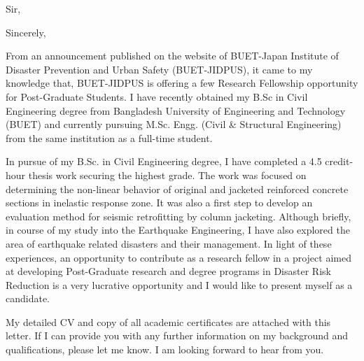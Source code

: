 %
\date{\today} %
\opening{Sir,} %
\closing{\hfill \break Sincerely,} %

\makelettertitle %
From an announcement published on the website of BUET-Japan Institute of Disaster Prevention and Urban Safety (BUET-JIDPUS), it came to my knowledge that, BUET-JIDPUS is offering a few Research Fellowship opportunity for Post-Graduate Students. I have recently obtained my B.Sc in Civil Engineering degree from Bangladesh University of Engineering and Technology (BUET) and currently pursuing M.Sc. Engg. (Civil \& Structural Engineering) from the same institution as a full-time student. 

In pursue of my B.Sc. in Civil Engineering degree, I have completed a 4.5 credit-hour thesis work securing the highest grade. The work was focused on determining the non-linear behavior of  original and jacketed reinforced concrete sections in inelastic response zone. It was also a first step to develop an evaluation method for seismic retrofitting by column jacketing. Although briefly, in course of my study into the Earthquake Engineering, I have also explored the area of earthquake related disasters and their management. In light of these experiences, an opportunity to contribute as a research fellow in a project aimed at developing Post-Graduate research and degree programs in Disaster Risk Reduction is a very lucrative opportunity and I would like to present myself as a candidate.  

My detailed CV and copy of all academic certificates are attached with this letter. If I can provide you with any further information on my background and qualifications, please let me know. I am  looking forward to hear from you.

\makeletterclosing %
\clearpage
